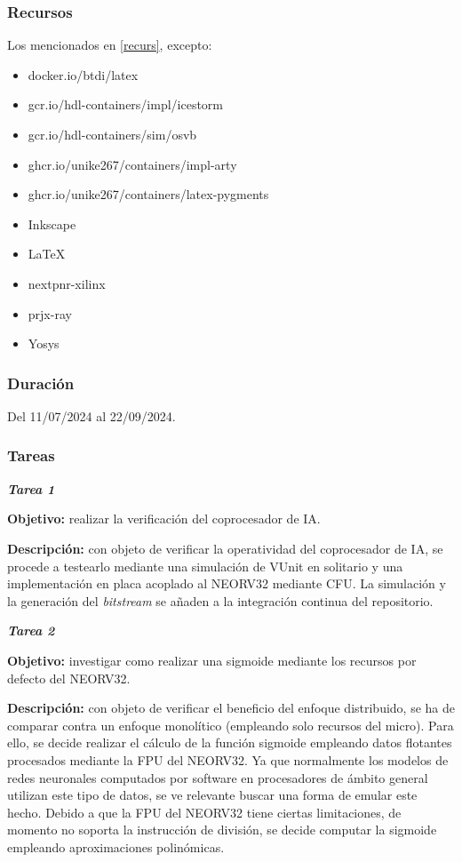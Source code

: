 \subsubsection{Recursos}

Los mencionados en \ref{recurs}, excepto:

\begin{itemize}
    \item docker.io/btdi/latex
    \item gcr.io/hdl-containers/impl/icestorm
    \item gcr.io/hdl-containers/sim/osvb
    \item ghcr.io/unike267/containers/impl-arty
    \item ghcr.io/unike267/containers/latex-pygments
    \item Inkscape
    \item \LaTeX
    \item nextpnr-xilinx
    \item prjx-ray
    \item Yosys
\end{itemize}

\subsubsection{Duración}

Del 11/07/2024 al 22/09/2024.

\subsubsection{Tareas}

\noindent \textbf{\textit{Tarea 1}}

\textbf{Objetivo:} realizar la verificación del coprocesador de IA. 

\textbf{Descripción:} con objeto de verificar la operatividad del coprocesador de IA, se procede a testearlo mediante una simulación de VUnit en solitario y una implementación en placa acoplado al NEORV32 mediante CFU.
La simulación y la generación del \textit{bitstream} se añaden a la integración continua del repositorio. 

\noindent \textbf{\textit{Tarea 2}}

\textbf{Objetivo:} investigar como realizar una sigmoide mediante los recursos por defecto del NEORV32. 

\textbf{Descripción:} con objeto de verificar el beneficio del enfoque distribuido, se ha de comparar contra un enfoque monolítico (empleando solo recursos del micro).
Para ello, se decide realizar el cálculo de la función sigmoide empleando datos flotantes procesados mediante la FPU del NEORV32.
Ya que normalmente los modelos de redes neuronales computados por software en procesadores de ámbito general utilizan este tipo de datos, se ve relevante buscar una forma de emular este hecho. 
Debido a que la FPU del NEORV32 tiene ciertas limitaciones, de momento no soporta la instrucción de división, se decide computar la sigmoide empleando aproximaciones polinómicas.

